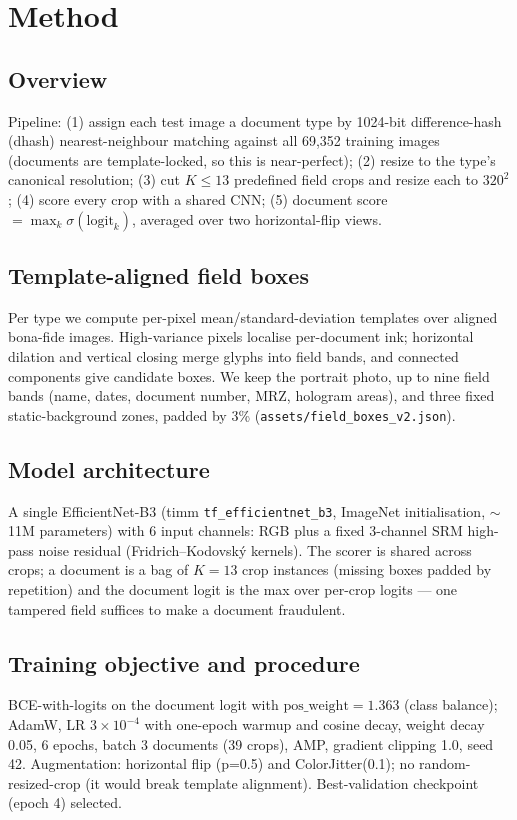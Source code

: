 \documentclass[11pt,a4paper]{article}
\begin{document}
\section{Method}
\label{sec:method}

\subsection{Overview}
Pipeline: (1) assign each test image a document type by 1024-bit
difference-hash (dhash) nearest-neighbour matching against all 69{,}352
training images (documents are template-locked, so this is near-perfect);
(2) resize to the type's canonical resolution; (3) cut $K\le 13$ predefined
field crops and resize each to $320^2$; (4) score every crop with a shared
CNN; (5) document score $=\max_k \sigma(\text{logit}_k)$, averaged over two
horizontal-flip views.

\subsection{Template-aligned field boxes}
Per type we compute per-pixel mean/standard-deviation templates over aligned
bona-fide images. High-variance pixels localise per-document ink; horizontal
dilation and vertical closing merge glyphs into field bands, and connected
components give candidate boxes. We keep the portrait photo, up to nine field
bands (name, dates, document number, MRZ, hologram areas), and three fixed
static-background zones, padded by 3\% (\texttt{assets/field\_boxes\_v2.json}).

\subsection{Model architecture}
A single EfficientNet-B3 (timm \texttt{tf\_efficientnet\_b3}, ImageNet
initialisation, $\sim$11M parameters) with 6 input channels: RGB plus a fixed
3-channel SRM high-pass noise residual (Fridrich--Kodovsk\'y kernels). The
scorer is shared across crops; a document is a bag of $K{=}13$ crop instances
(missing boxes padded by repetition) and the document logit is the max over
per-crop logits --- one tampered field suffices to make a document fraudulent.

\subsection{Training objective and procedure}
BCE-with-logits on the document logit with $\text{pos\_weight}=1.363$
(class balance); AdamW, LR $3\times10^{-4}$ with one-epoch warmup and cosine
decay, weight decay 0.05, 6 epochs, batch 3 documents (39 crops), AMP,
gradient clipping 1.0, seed 42. Augmentation: horizontal flip (p=0.5) and
ColorJitter(0.1); no random-resized-crop (it would break template alignment).
Best-validation checkpoint (epoch 4) selected.
\end{document}
